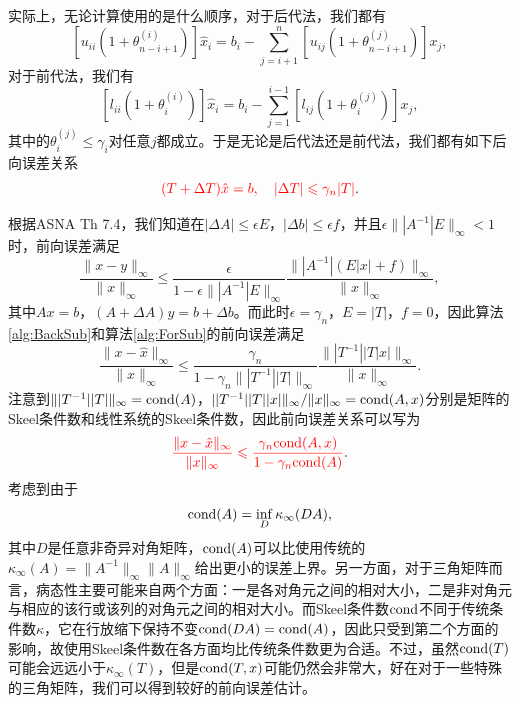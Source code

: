 \documentclass[a4paper,10pt]{ctexart}
\begin{document}
实际上，无论计算使用的是什么顺序，对于后代法，我们都有
\[
    [u_{ii}(1+\theta^{(i)}_{n-i+1})] \hat{x}_i = b_i - \sum_{j=i+1}^{n} [u_{ij}(1+\theta^{(j)}_{n-i+1})]x_j,
\]
对于前代法，我们有
\[
    [l_{ii}(1+\theta_{i}^{(i)})] \hat{x}_i = b_i - \sum_{j=1}^{i-1} [l_{ij}(1+\theta_{i}^{(j)})]x_j,
\]
其中的$ \theta_{i}^{(j)}\leqslant \gamma_i $对任意$ j $都成立。于是无论是后代法还是前代法，我们都有如下后向误差关系
\begin{equation}
    \textcolor{red}{(T+\Delta T) \hat{x} = b,\quad
    |\Delta T|\leqslant \gamma_n |T|}.
\end{equation}

根据ASNA Th 7.4，我们知道在$ | \Delta A | \leqslant \epsilon E $，$ | \Delta b | \leqslant \epsilon f $，并且$ \epsilon\| |A^{-1}|E \|_\infty < 1 $时，前向误差满足
\begin{equation}
    \frac{\| x-y \|_\infty}{\| x \|_\infty} \leqslant \frac{\epsilon}{1-\epsilon \| |A^{-1}|E \|_\infty}  \frac{\| |A^{-1}|(E|x|+f) \|_\infty}{\| x \|_\infty },
\end{equation}
其中$ Ax=b $，$ (A+\Delta A)y = b + \Delta b $。而此时$ \epsilon = \gamma_n $，$ E = |T| $，$ f = 0 $，因此算法\ref{alg:BackSub}和算法\ref{alg:ForSub}的前向误差满足
\begin{equation}
    \frac{\| x-\hat{x} \|_\infty}{\| x \|_\infty} \leqslant \frac{\gamma_n}{1-\gamma_n \| |T^{-1}| |T| \|_\infty}  \frac{\| |T^{-1}||T|x| \|_\infty}{\| x \|_\infty }.
\end{equation}
注意到$ \| |T^{-1}| |T| \|_\infty = {\rm cond}(A) $，$ | |T^{-1}| |T| |x| \|_\infty / \| x \|_\infty = {\rm cond}(A,x) $分别是矩阵的Skeel条件数和线性系统的Skeel条件数，因此前向误差关系可以写为
\begin{equation}
    \textcolor{red}{\frac{\| x-\hat{x} \|_\infty}{\| x \|_\infty} \leqslant \frac{\gamma_n {\rm cond}(A,x)}{1-\gamma_n {\rm cond}(A)}}.
\end{equation}
考虑到由于
\[
    {\rm cond}(A) = \inf_D \kappa_\infty(DA),
\]
其中$ D $是任意非奇异对角矩阵，$ {\rm cond}(A) $可以比使用传统的$ \kappa_\infty(A) = \| A^{-1} \|_\infty \| A \|_\infty $给出更小的误差上界。另一方面，对于三角矩阵而言，病态性主要可能来自两个方面：一是各对角元之间的相对大小，二是非对角元与相应的该行或该列的对角元之间的相对大小。而Skeel条件数$ {\rm cond} $不同于传统条件数$ \kappa $，它在行放缩下保持不变$ {\rm cond}(DA) = {\rm cond}(A) $，因此只受到第二个方面的影响，故使用Skeel条件数在各方面均比传统条件数更为合适。不过，虽然$ {\rm cond}(T) $可能会远远小于$ \kappa_\infty(T) $，但是$ {\rm cond}(T,x) $可能仍然会非常大，好在对于一些特殊的三角矩阵，我们可以得到较好的前向误差估计。
\end{document}

